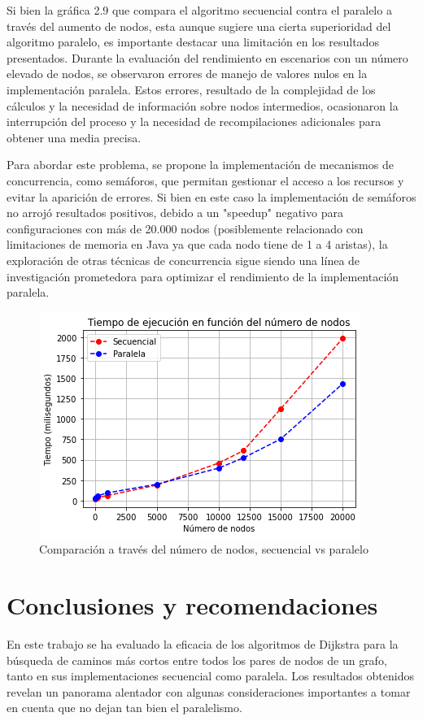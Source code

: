 Si bien la gráfica 2.9 que compara el algoritmo secuencial contra el paralelo a través del aumento de nodos, esta aunque sugiere una cierta superioridad del algoritmo paralelo, es importante destacar una limitación en los resultados presentados. Durante la evaluación del rendimiento en escenarios con un número elevado de nodos, se observaron errores de manejo de valores nulos en la implementación paralela. Estos errores, resultado de la complejidad de los cálculos y la necesidad de información sobre nodos intermedios, ocasionaron la interrupción del proceso y la necesidad de recompilaciones adicionales para obtener una media precisa.

Para abordar este problema, se propone la implementación de mecanismos de concurrencia, como semáforos, que permitan gestionar el acceso a los recursos y evitar la aparición de errores. Si bien en este caso la implementación de semáforos no arrojó resultados positivos, debido a un "speedup" negativo para configuraciones con más de 20.000 nodos (posiblemente relacionado con limitaciones de memoria en Java ya que cada nodo tiene de 1 a 4 aristas), la exploración de otras técnicas de concurrencia sigue siendo una línea de investigación prometedora para optimizar el rendimiento de la implementación paralela.

\begin{figure}[h]
	\centering \includegraphics[width=0.75\linewidth]{img/Grafica_tiempos_9.png}
	\caption{Comparación a través del número de nodos, secuencial vs paralelo}
	\label{fig:etiqueta1}
\end{figure}


\section{Conclusiones y recomendaciones}


En este trabajo se ha evaluado la eficacia de los algoritmos de Dijkstra para la búsqueda de caminos más cortos entre todos los pares de nodos de un grafo, tanto en sus implementaciones secuencial como paralela. Los resultados obtenidos revelan un panorama alentador con algunas consideraciones importantes a tomar en cuenta que no dejan tan bien el paralelismo.

